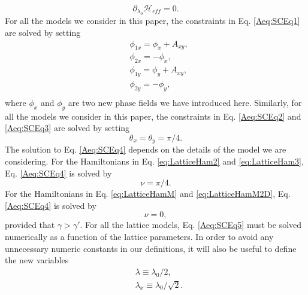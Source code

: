 \documentclass[prb,aps,twocolumn,groupaddress,floatfix]{revtex4-1}
\begin{document}
\begin{equation}
\partial_{\lambda_0} \mathcal{H}_{eff} = 0.\label{Aeq:SCEq5}
\end{equation}
For all the models we consider in this paper, the constraints in Eq. \ref{Aeq:SCEq1} are solved by setting 
\begin{equation}
\begin{split}
&\phi_{1x} = \phi_x + A_{xy},\\
&\phi_{2x} = -\phi_x,\\
&\phi_{1y} = \phi_y + A_{xy},\\
&\phi_{2y} = -\phi_y,\\
\end{split}\label{Aeq:HSPhaseCont}
\end{equation}
where $\phi_x$ and $\phi_y$ are two new phase fields we have introduced here. Similarly, for all the models we consider in this paper, the constraints in Eq. \ref{Aeq:SCEq2} and \ref{Aeq:SCEq3} are solved by setting
\begin{equation}
\theta_x = \theta_y = \pi/4.
\end{equation}
The solution to Eq. \ref{Aeq:SCEq4} depends on the details of the model we are considering. For the Hamiltonians in Eq. \ref{eq:LatticeHam2} and \ref{eq:LatticeHam3},  Eq. \ref{Aeq:SCEq4} is solved by 
\begin{equation}
\nu = \pi/4.
\end{equation}
For the Hamiltonians in Eq. \ref{eq:LatticeHamM} and \ref{eq:LatticeHamM2D},  Eq. \ref{Aeq:SCEq4} is solved by 
\begin{equation}
\nu = 0,
\end{equation}
provided that $\gamma > \gamma'$. For all the lattice models, Eq. \ref{Aeq:SCEq5} must be solved numerically as a function of the lattice parameters. In order to avoid any unnecessary numeric constants in our definitions, it will also be useful to define the new variables 
\begin{equation}\begin{split}
&\lambda \equiv \lambda_0/2,\\
&\lambda_x \equiv \lambda_0/\sqrt{2}.
\end{split}\label{Aeq:FinalAp1}
\end{equation}
\end{document}
